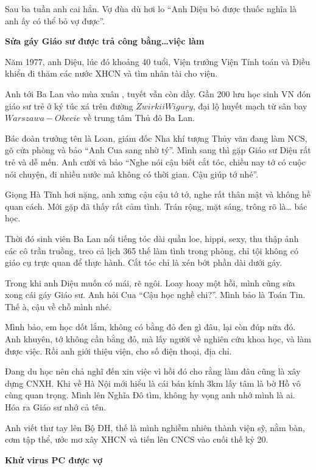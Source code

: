 Sau ba tuần anh cai hẳn. Vợ đùa dù hơi lo “Anh Diệu bỏ được thuốc nghĩa là anh ấy có thể bỏ vợ được”.

\begin{center}
\textbf{Sửa gáy Giáo sư được trả công bằng…việc làm}
\end{center}
Năm 1977, anh Diệu, lúc đó khoảng 40 tuổi, Viện trưởng Viện Tính toán và Điều khiển đi thăm các nước XHCN và tìm nhân tài cho viện.

Anh tới Ba Lan vào mùa xuân , tuyết vẫn còn dầy. Gần 200 lưu học sinh VN đón giáo sư trẻ ở ký túc xá trên đường $\dot{Z}wirki i Wigury$, đại lộ huyết mạch từ sân bay $Warszawa-Okecie$ về trung tâm Thủ đô Ba Lan.

Bác đoàn trưởng tên là Loan, giám đốc Nha khí tượng Thủy văn đang làm NCS, gõ cửa phòng và bảo “Anh Cua sang nhờ tý”. Mình sang thì gặp Giáo sư Diệu rất trẻ và dễ mến. Anh cười và bảo “Nghe nói cậu biết cắt tóc, chiều nay tớ có cuộc nói chuyện, đi nhiều nước mà không có thời gian. Cậu giúp tớ nhé”.

Giọng Hà Tĩnh hơi nặng, anh xưng cậu cậu tớ tớ, nghe rất thân mật và không hề quan cách. Mới gặp đã thấy rất cảm tình. Trán rộng, mặt sáng, trông rõ là… bác học.

Thời đó sinh viên Ba Lan nổi tiếng tóc dài quần loe, hippi, sexy, thu thập ảnh các cô trần truồng, treo cả lịch 365 thế làm tình trong phòng, chỉ tội không có giáo cụ trực quan để thực hành. Cắt tóc chỉ là xén bớt phần dài dưới gáy.

Trong khi anh Diệu muốn có mái, rẽ ngôi. Loay hoay một hồi, mình cũng sửa xong cái gáy Giáo sư. Anh hỏi Cua “Cậu học nghề chi?”. Mình bảo là Toán Tin. Thế à, cậu về chỗ mình nhé.

Mình bảo, em học dốt lắm, không có bằng đỏ đen gì đâu, lại còn đúp nữa đó. Anh khuyên, tớ không cần bằng đỏ, mà lấy người về nghiên cứu khoa học, và làm được việc. Rồi anh giới thiệu viện, cho số điện thoại, địa chỉ.

Đang du học nên chả nghĩ đến xin việc vì hồi đó cho rằng làm đâu cũng là xây dựng CNXH. Khi về Hà Nội mới hiểu là cái bán kính 3km lấy tâm là bờ Hồ vô cùng quan trọng. Mình lên Nghĩa Đô tìm, không hy vọng anh nhớ mình là ai. Hóa ra Giáo sư nhớ cả tên.

Anh viết thư tay lên Bộ ĐH, thế là mình nghiễm nhiên thành viện sỹ, nằm bàn, cơm tập thể, ước mơ xây XHCN và tiến lên CNCS vào cuối thế kỷ 20.

\begin{center}
\textbf{Khử virus PC được vợ}
\end{center}

